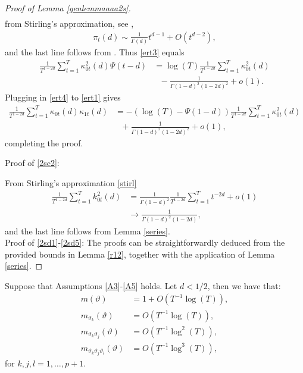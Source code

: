 {{\begin{proof}[Proof of Lemma \ref{genlemmaaaa2s}]
\begin{align*}
\end{align*}
from Stirling's approximation, see \textcite[page 257 6.1.47]{abramowitz1964handbook},
\begin{align}
    \pi_t(d) \sim \frac{1}{\Gamma(d)} t^{d-1} + O(t^{d-2}), \label{stirl}
\end{align}
and the last line follows from \textcite[Lemma S.10]{hualde2020truncated}. Thus \eqref{ert3} equals
\begin{align}
    \frac{1}{T^{1-2d} } \sum_{t = 1}^T \kappa^2_{0t}(d) \Psi(t-d) &=  \log(T) \frac{1}{T^{1-2d} }  \sum_{t = 1}^T \kappa^2_{0t}(d) \nonumber \\
   &\ \ \ - \frac{1}{\Gamma(1-d)^2 (1-2d)^2} + o(1). \label{ert4}
\end{align}
Plugging in \eqref{ert4} to \eqref{ert1} gives 
\begin{align*}
    \frac{1}{T^{1-2d} } \sum_{t = 1}^T \kappa_{0t}(d) \kappa_{1t}(d)  &=  - \left( \log(T) - \Psi(1-d)\right) \frac{1}{T^{1-2d} }  \sum_{t = 1}^T \kappa^2_{0t}(d) \nonumber \\ 
    &\ \ \ + \frac{1}{\Gamma(1-d)^2 (1-2d)^2}  + o(1), 
\end{align*}
completing the proof.

Proof of \eqref{2sc2}: 

From Stirling's approximation \eqref{stirl}
\begin{align*}
     \frac{1}{T^{1-2d}}\sum_{t = 1}^T k^2_{0t}(d) &= \frac{1}{\Gamma\left(1-d\right)^2} \frac{1}{T^{1-2d}} \sum_{t = 1}^T t^{-2d} + o(1) \\
     &\rightarrow \frac{1}{\Gamma(1-d)^2 (1-2d)},
\end{align*}
and the last line follows from Lemma \ref{series}.\\

Proof of \eqref{2sd1}-\eqref{2sd5}: The proofs can be straightforwardly deduced from the provided bounds in Lemma \ref{r12}, together with the application of Lemma \ref{series}.
\end{proof}

\begin{lemma} \label{genlemmaa1stat} Suppose that Assumptions \ref{A3}-\ref{A5} holds. Let $d < 1/2$, then we have that:
\begin{align}
    m(\vartheta) &= 1 + O(T^{-1} \log(T)), \label{genab1s} \\
    m_{\vartheta_k}(\vartheta) &=  O(T^{-1} \log(T)) \label{genab2s}, \\
     m_{\vartheta_k \vartheta_j}(\vartheta) &=  O(T^{-1}\log^2(T)), \label{genab3s} \\
     m_{\vartheta_k \vartheta_j \vartheta_l}(\vartheta) &=  O(T^{-1}\log^3(T)), \label{genab4s} 
\end{align}
for $k,j,l = 1,\ldots, p+1$.
\end{lemma}

}}

